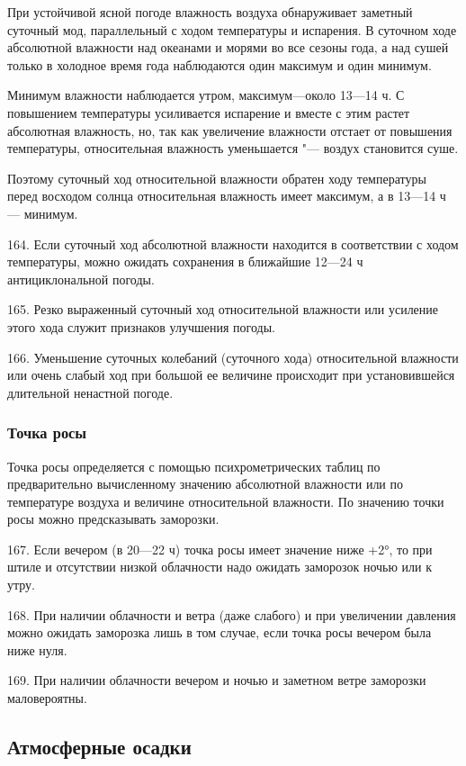 При устойчивой ясной погоде влажность воздуха обнаруживает заметный суточный мод, параллельный с ходом температуры и испарения. В суточном ходе абсолютной влажности над океанами и морями во все сезоны года, а над сушей только в холодное время года наблюдаются один максимум и один минимум.

Минимум влажности наблюдается утром, максимум—около 13—14 ч. С повышением температуры усиливается испарение и вместе с этим растет абсолютная влажность, но, так как увеличение влажности отстает от повышения температуры, относительная влажность уменьшается "--- воздух становится суше.

Поэтому суточный ход относительной влажности обратен ходу температуры перед восходом солнца относительная влажность имеет максимум, а в 13—14 ч — минимум.

164. Если суточный ход абсолютной влажности находится в соответствии с ходом температуры, можно ожидать сохранения в ближайшие 12—24 ч антициклональной погоды.

165. Резко выраженный суточный ход относительной влажности или усиление этого хода служит признаков улучшения погоды.

166. Уменьшение суточных колебаний (суточного хода) относительной влажности или очень слабый ход при большой ее величине происходит при установившейся длительной ненастной погоде.

\subsubsection{Точка росы}

Точка росы определяется с помощью психрометрических таблиц по предварительно вычисленному значению абсолютной влажности или по температуре воздуха и величине относительной влажности. По значению точки росы можно предсказывать заморозки.

167. Если вечером (в 20—22 ч) точка росы имеет значение ниже +2°, то при штиле и отсутствии низкой облачности надо ожидать заморозок ночью или к утру.

168. При наличии облачности и ветра (даже слабого) и при увеличении давления можно ожидать заморозка лишь в том случае, если точка росы вечером была ниже нуля.

169. При наличии облачности вечером и ночью и заметном ветре заморозки маловероятны.

\subsection{Атмосферные осадки}

